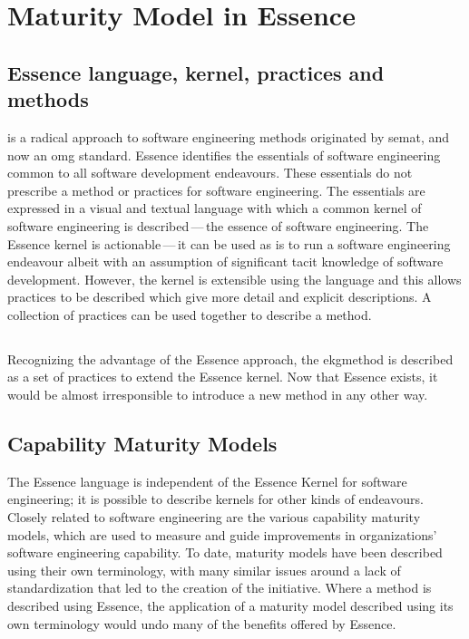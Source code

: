 \pagebreak
\chapter{Maturity Model in Essence}\label{ch:maturity-model-in-essence}

\section{Essence language, kernel, practices and methods}\label{subsec:essence-language-kernel-practices-and-methods}

 is a radical approach to software engineering methods originated by \gls{semat},
and now an \gls{omg}\autocite{omgwebsite} standard.
Essence identifies the essentials of software engineering common to all software development endeavours.
These essentials do not prescribe a method or practices for software engineering.
The essentials are expressed in a visual and textual language with which a common kernel of software engineering
is described\,---\,the essence of software engineering.
The Essence kernel is actionable\,---\,it can be used as is to run a software engineering endeavour albeit
with an assumption of significant tacit knowledge of software development.
However, the kernel is extensible using the language and this allows practices to be described which give more detail
and explicit descriptions.
A collection of practices can be used together to describe a method.

\section{}\label{subsec:ekg-method}

Recognizing the advantage of the Essence approach, the \agnos \gls{ekgmethod} is described as
a set of practices to extend the Essence kernel.
Now that Essence exists, it would be almost irresponsible to introduce a new method in any other way.

\section{Capability Maturity Models}\label{subsec:capability-maturity-models}

The Essence language is independent of the Essence Kernel for software engineering;
it is possible to describe kernels for other kinds of endeavours.
Closely related to software engineering are the various capability maturity models, which are used to measure and
guide improvements in organizations' software engineering capability.
To date, maturity models have been described using their own terminology, with many similar issues around a lack of
standardization that led to the creation of the  initiative.
Where a method is described using Essence, the application of a maturity model described using its own
terminology would undo many of the benefits offered by Essence.

